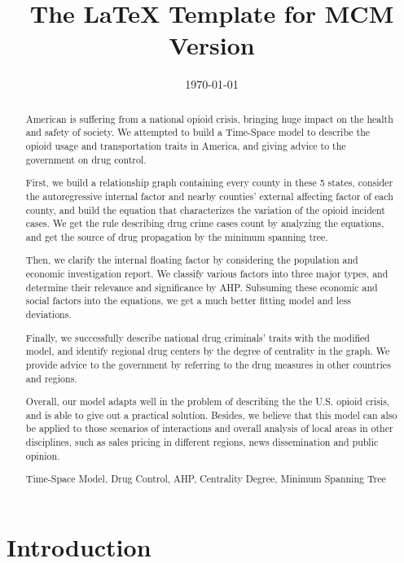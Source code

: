 \documentclass{mcmthesis}
\title{The \LaTeX{} Template for MCM Version \MCMversion}
\author{}
\date{\today}
\begin{document}
\begin{abstract}
	American is suffering from a national opioid crisis, bringing huge impact on the health and safety of society. We attempted to build a Time-Space model to describe the opioid usage and transportation traits in America, and giving advice to the government on drug control.
	
	First, we build a relationship graph containing every county in these 5 states, consider the autoregressive internal factor and nearby counties' external affecting factor of each county, and build the equation that characterizes the variation of the opioid incident cases. We get the rule describing drug crime cases count by analyzing the equations, and get the source of drug propagation by the minimum spanning tree.
	
	Then, we clarify the internal floating factor by considering the population and economic investigation report. We classify various factors into three major types, and determine their relevance and significance by AHP. Subsuming these economic and social factors into the equations, we get a much better fitting model and less deviations.
	
	Finally, we successfully describe national drug criminals’ traits with the modified model, and identify regional drug centers by the degree of centrality in the graph. We provide advice to the government by referring to the drug measures in other countries and regions.
	
	Overall, our model adapts well in the problem of describing the the U.S. opioid crisis, and is able to give out a practical solution. Besides, we believe that this model can also be applied to those scenarios of interactions and overall analysis of local areas in other disciplines, such as sales pricing in different regions, news dissemination and public opinion.
	\begin{keywords}
		 Time-Space Model, Drug Control, AHP, Centrality Degree, Minimum Spanning Tree
	\end{keywords}
\end{abstract}
\maketitle
\pagestyle{empty}
\tableofcontents

\newpage
\pagestyle{fancy}
\setcounter{page}{1}
\section{Introduction}
\end{document}
